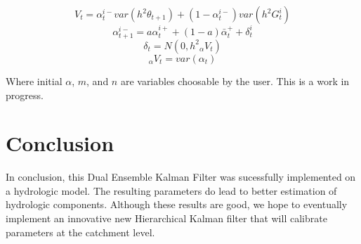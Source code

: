 \begin{equation}\label{eq:dekf_V_2}
V_{t} = \alpha_{t}^{i-} var(h^{2}\theta_{t+1}) + (1-\alpha_{t}^{i-}) var(h^{2}G_{t}^{i})
\end{equation}
\begin{equation}\label{eq:dekf_V_3}
\alpha_{t+1}^{i-} = a\alpha_{t}^{i+} + (1-a)\bar{\alpha}_{t}^{+} + \delta_{t}^{i}
\end{equation}
\begin{equation}\label{eq:dekf_V_4}
\delta_{t} = N(0, h^{2}{}_{\alpha}V_{t})
\end{equation}
\begin{equation}\label{eq:dekf_V_5}
{}_{\alpha}V_{t} = var(\alpha_{t})
\end{equation}

Where initial $\alpha$, $m$, and $n$ are variables choosable by the user. This is a work in progress.


\chapter{Conclusion}

In conclusion, this Dual Ensemble Kalman Filter was sucessfully implemented on a hydrologic model. The resulting parameters do lead to better estimation of hydrologic components. Although these results are good, we hope to eventually implement an innovative new Hierarchical Kalman filter that will calibrate parameters at the catchment level.

